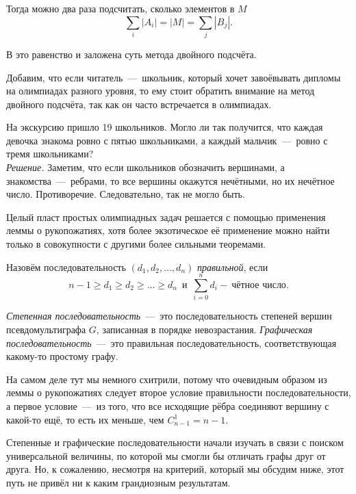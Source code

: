 	Тогда можно два раза подсчитать, сколько элементов в $M$
$$\sum_i |A_i| = |M| = \sum_j |B_j|.$$	
	
	В это равенство и заложена суть метода двойного подсчёта.
	
	Добавим, что если читатель~---~школьник, который хочет завоёвывать дипломы на олимпиадах разного уровня, то ему стоит обратить внимание на метод двойного подсчёта, так как он часто встречается в олимпиадах.
	
\begin{example}
	На экскурсию пришло 19 школьников. Могло ли так получится, что каждая девочка знакома ровно с пятью школьниками, а каждый мальчик~---~ровно с тремя школьниками?\\
	
	\emph{Решение.} Заметим, что если школьников обозначить вершинами, а знакомства~---~ребрами, то все вершины окажутся нечётными, но их нечётное число. Противоречие. Следовательно, так не могло быть.
\end{example}

	Целый пласт простых олимпиадных задач решается с помощью применения леммы о рукопожатиях, хотя более экзотическое её применение можно найти только в совокупности с другими более сильными теоремами. 


\begin{definition}
	Назовём последовательность $(d_1, d_2, \dots, d_n)$ \emph{правильной}, если $$n-1 \geqslant d_1 \geqslant d_2 \geqslant \dots \geqslant d_n \;\ \text{и} \;\ \sum_{i=0}^n d_i - \!\ \text{чётное число}.$$  
\end{definition}

\begin{definition}
	\emph{Степенная последовательность}~---~это последовательность степеней вершин псевдомультиграфа $G$, записанная в порядке невозрастания. \emph{Графическая последовательность}~---~это правильная последовательность, соответствующая какому-то простому графу.
\end{definition}

	На самом деле тут мы немного схитрили, потому что очевидным образом из леммы о рукопожатиях следует второе условие правильности последовательности, а первое условие~---~из того, что все исходящие рёбра соединяют вершину с какой-то ещё, то есть их меньше, чем $C_{n-1}^1 = n-1$. 
	
	Степенные и графические последовательности начали изучать в связи с поиском универсальной величины, по которой мы смогли бы отличать графы друг от друга. Но, к сожалению, несмотря на критерий, который мы обсудим ниже, этот путь не привёл ни к каким грандиозным результатам.	
	
